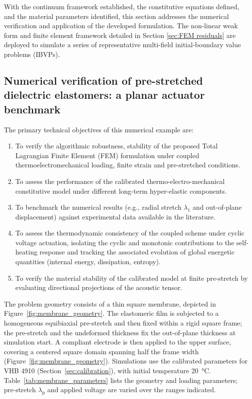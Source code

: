 

With the continuum framework established, the constitutive equations defined, and the material parameters identified, this section addresses the numerical verification and application of the developed formulation. The non-linear weak form and finite element framework detailed in Section \ref{sec:FEM residuals} are deployed to simulate a series of representative multi-field initial-boundary value problems (IBVPs).

\subsection{Numerical verification of pre-stretched dielectric elastomers: a planar actuator benchmark}

The primary technical objectives of this numerical example are:

\begin{enumerate}
    \item To verify the algorithmic robustness, stability of the proposed Total Lagrangian Finite Element (FEM) formulation under coupled thermoelectromechanical loading, finite strain and pre-stretched conditions.
    \item To assess the performance of the calibrated thermo-electro-mechanical constitutive model under different long-term hyper-elastic components.
    \item To benchmark the numerical results (e.g., radial stretch $\lambda_1$ and out-of-plane displacement) against experimental data available in the literature.
    \item To assess the thermodynamic consistency of the coupled scheme under cyclic voltage actuation, isolating the cyclic and monotonic contributions to the self-heating response and tracking the associated evolution of global energetic quantities (internal energy, dissipation, entropy).
    \item To verify the material stability of the calibrated model at finite pre-stretch by evaluating directional projections of the acoustic tensor.
\end{enumerate}

The problem geometry consists of a thin square membrane, depicted in Figure~\ref{fig:membrane_geometry}. The elastomeric film is subjected to a homogeneous equibiaxial pre-stretch and then fixed within a rigid square frame; the pre-stretch and the undeformed thickness fix the out-of-plane thickness at simulation start. A compliant electrode is then applied to the upper surface, covering a centered square domain spanning half the frame width (Figure~\ref{fig:membrane_geometry}). Simulations use the calibrated parameters for VHB 4910 (Section~\ref{sec:calibration}), with initial temperature \qty{20}{\degreeCelsius}. Table~\ref{tab:membrane_parameters} lists the geometry and loading parameters; pre-stretch $\lambda_\text{p}$ and applied voltage are varied over the ranges indicated.

